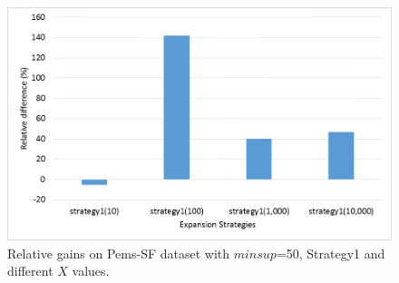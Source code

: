 %
%
%
%

\begin{figure}[!t]
\includegraphics[width=5in]{immagini_extension/pems_strategy1.png}
\caption{Relative gains on Pems-SF dataset with $minsup$=50, Strategy1 and different $X$ values.
}
\label{pems_strategy1}
\end{figure}

